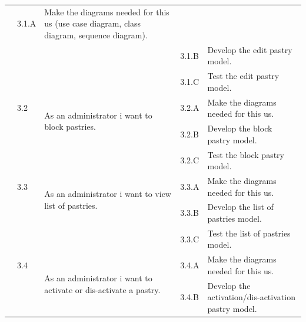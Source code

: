 \documentclass[12pt,a4paper]{report}
\begin{document}
\begin{table}[H]
\begin{center}
\begin{tabular}{|  p{3cm}|  p{1cm}| p{4cm}|  p{1cm}| p{6cm}|}
			&				                      
			3.1.A &                        
			Make the diagrams needed for this \ac{us} (use case diagram, class diagram, sequence diagram).
			\\ 
			\cline{4-5}    
			&                   
			&                                 
			&                        
			3.1.B &                        
			Develop the edit pastry model.
			\\ 
			\cline{4-5}    
			&                   
			&                                 
			&                        
			3.1.C &                        
			Test the edit pastry model.
			\\
			\cline{2-5}  
			
			&                       
			3.2  &  
			\multirow{2}{4cm}{As an administrator i want to block pastries.}
			
			&				                      
			3.2.A &                        
			Make the diagrams needed for this \ac{us}.
			\\ 
			\cline{4-5}    
			&                   
			&                                 
			&                        
			3.2.B &                        
			Develop the block pastry model.
			\\ 
			\cline{4-5}    
			&                   
			&                                 
			&                        
			3.2.C &                        
			Test the block pastry model.
			\\
			\cline{2-5}  
			
			&                       
			3.3  &  
			\multirow{2}{4cm}{As an administrator i want to view list of pastries.}
			
			&				                      
			3.3.A &                        
			Make the diagrams needed for this \ac{us}.
			\\ 
			\cline{4-5}    
			&                   
			&                                 
			&                        
			3.3.B &                        
			Develop the list of pastries model.
			\\ 
			\cline{4-5}    
			&                   
			&                                 
			&                        
			3.3.C &                        
			Test the list of pastries model.
			\\
			\cline{2-5}  
			
			&                       
			3.4  &  
			\multirow{2}{4cm}{As an administrator i want to activate or dis-activate a pastry.}
			
			&				                      
			3.4.A &                        
			Make the diagrams needed for this \ac{us}.
			\\ 
			\cline{4-5}    
			&                   
			&                                 
			&                        
			3.4.B &                        
			Develop the activation/dis-activation pastry model.
			
			
			
			
			
			
		\end{tabular}
		
	\end{center}
	
\end{table}
\end{document}
